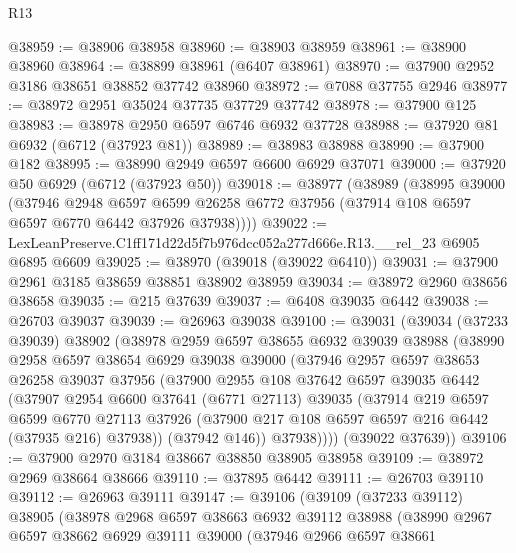 \begin{lexlean}{R13}
\begin{coremodule}
@38959 := @38906 @38958
@38960 := @38903 @38959
@38961 := @38900 @38960
@38964 := @38899 @38961 (@6407 @38961)
@38970 := @37900 @2952 @3186 @38651 @38852 @37742 @38960
@38972 := @7088 @37755 @2946
@38977 := @38972 @2951 @35024 @37735 @37729 @37742
@38978 := @37900 @125
@38983 := @38978 @2950 @6597 @6746 @6932 @37728
@38988 := @37920 @81 @6932 (@6712 (@37923 @81))
@38989 := @38983 @38988
@38990 := @37900 @182
@38995 := @38990 @2949 @6597 @6600 @6929 @37071
@39000 := @37920 @50 @6929 (@6712 (@37923 @50))
@39018 := @38977
    (@38989
      (@38995
        @39000
        (@37946
          @2948
          @6597
          @6599
          @26258
          @6772
          @37956
          (@37914 @108 @6597 @6597 @6770 @6442 @37926 @37938))))
@39022 := LexLeanPreserve.C1ff171d22d5f7b976dcc052a277d666e.R13.__rel_23 @6905 @6895 @6609
@39025 := @38970 (@39018 (@39022 @6410))
@39031 := @37900 @2961 @3185 @38659 @38851 @38902 @38959
@39034 := @38972 @2960 @38656 @38658
@39035 := @215 @37639
@39037 := @6408 @39035 @6442
@39038 := @26703 @39037
@39039 := @26963 @39038
@39100 := @39031
    (@39034
      (@37233 @39039)
      @38902
      (@38978
        @2959
        @6597
        @38655
        @6932
        @39039
        @38988
        (@38990
          @2958
          @6597
          @38654
          @6929
          @39038
          @39000
          (@37946
            @2957
            @6597
            @38653
            @26258
            @39037
            @37956
            (@37900
              @2955
              @108
              @37642
              @6597
              @39035
              @6442
              (@37907
                @2954
                @6600
                @37641
                (@6771 @27113)
                @39035
                (@37914
                  @219
                  @6597
                  @6599
                  @6770
                  @27113
                  @37926
                  (@37900 @217 @108 @6597 @6597 @216 @6442 (@37935 @216) @37938))
                (@37942 @146))
              @37938))))
      (@39022 @37639))
@39106 := @37900 @2970 @3184 @38667 @38850 @38905 @38958
@39109 := @38972 @2969 @38664 @38666
@39110 := @37895 @6442
@39111 := @26703 @39110
@39112 := @26963 @39111
@39147 := @39106
    (@39109
      (@37233 @39112)
      @38905
      (@38978
        @2968
        @6597
        @38663
        @6932
        @39112
        @38988
        (@38990
          @2967
          @6597
          @38662
          @6929
          @39111
          @39000
          (@37946
            @2966
            @6597
            @38661

\end{coremodule}
\end{lexlean}
